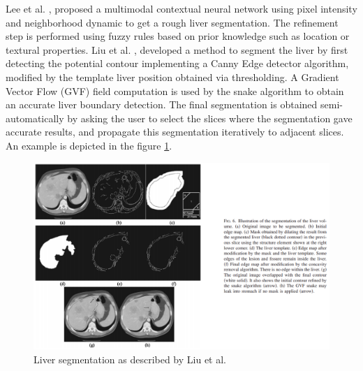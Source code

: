 \documentclass[]{article}
\begin{document}
	Lee et al. \cite{Lee2003}, proposed a multimodal contextual neural network using
	pixel intensity and neighborhood dynamic to get a rough liver
	segmentation. The refinement step is performed using fuzzy rules based
	on prior knowledge such as location or textural properties.
	Liu et al. \cite{Liu2005}, developed a method to segment the liver by first detecting the potential
	contour implementing a Canny Edge detector algorithm, modified by the
	template liver position obtained via thresholding. A Gradient Vector
	Flow (GVF) field computation is used by the snake algorithm to obtain an
	accurate liver boundary detection. The final segmentation is obtained
	semi-automatically by asking the user to select the slices where the
	segmentation gave accurate results, and propagate this segmentation
	iteratively to adjacent slices. An example is depicted in the figure \ref{LiuGVF}.
	\begin{figure} [ht!]
		\centering
		\includegraphics[width=0.7\linewidth]{images/image15}
		\caption{Liver segmentation as described by Liu et al. \cite{Liu2005}}
		\label{LiuGVF}
	\end{figure}
	
	
	
\end{document}
